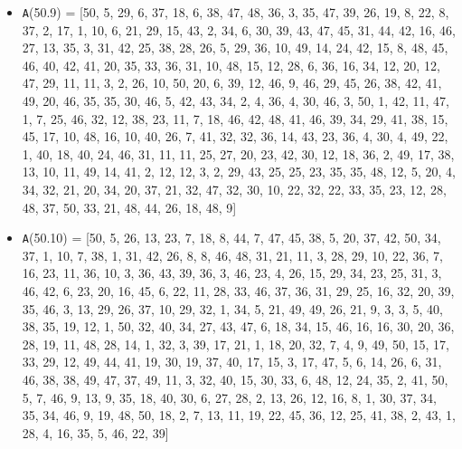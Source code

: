 \documentclass[runningheads, a4paper]{llncs}
\begin{document}
\begin{itemize}
	\item {\texttt A(50.9) = } [50, 5, 29, 6, 37, 18, 6, 38, 47, 48, 36, 3, 35, 47, 39, 26, 19, 8, 22, 8, 37, 2, 17, 1, 10, 6, 21, 29, 15, 43, 2, 34, 6, 30, 39, 43, 47, 45, 31, 44, 42, 16, 46, 27, 13, 35, 3, 31, 42, 25, 38, 28, 26, 5, 29, 36, 10, 49, 14, 24, 42, 15, 8, 48, 45, 46, 40, 42, 41, 20, 35, 33, 36, 31, 10, 48, 15, 12, 28, 6, 36, 16, 34, 12, 20, 12, 47, 29, 11, 11, 3, 2, 26, 10, 50, 20, 6, 39, 12, 46, 9, 46, 29, 45, 26, 38, 42, 41, 49, 20, 46, 35, 35, 30, 46, 5, 42, 43, 34, 2, 4, 36, 4, 30, 46, 3, 50, 1, 42, 11, 47, 1, 7, 25, 46, 32, 12, 38, 23, 11, 7, 18, 46, 42, 48, 41, 46, 39, 34, 29, 41, 38, 15, 45, 17, 10, 48, 16, 10, 40, 26, 7, 41, 32, 32, 36, 14, 43, 23, 36, 4, 30, 4, 49, 22, 1, 40, 18, 40, 24, 46, 31, 11, 11, 25, 27, 20, 23, 42, 30, 12, 18, 36, 2, 49, 17, 38, 13, 10, 11, 49, 14, 41, 2, 12, 12, 3, 2, 29, 43, 25, 25, 23, 35, 35, 48, 12, 5, 20, 4, 34, 32, 21, 20, 34, 20, 37, 21, 32, 47, 32, 30, 10, 22, 32, 22, 33, 35, 23, 12, 28, 48, 37, 50, 33, 21, 48, 44, 26, 18, 48, 9]
	\item {\texttt A(50.10) = } [50, 5, 26, 13, 23, 7, 18, 8, 44, 7, 47, 45, 38, 5, 20, 37, 42, 50, 34, 37, 1, 10, 7, 38, 1, 31, 42, 26, 8, 8, 46, 48, 31, 21, 11, 3, 28, 29, 10, 22, 36, 7, 16, 23, 11, 36, 10, 3, 36, 43, 39, 36, 3, 46, 23, 4, 26, 15, 29, 34, 23, 25, 31, 3, 46, 42, 6, 23, 20, 16, 45, 6, 22, 11, 28, 33, 46, 37, 36, 31, 29, 25, 16, 32, 20, 39, 35, 46, 3, 13, 29, 26, 37, 10, 29, 32, 1, 34, 5, 21, 49, 49, 26, 21, 9, 3, 3, 5, 40, 38, 35, 19, 12, 1, 50, 32, 40, 34, 27, 43, 47, 6, 18, 34, 15, 46, 16, 16, 30, 20, 36, 28, 19, 11, 48, 28, 14, 1, 32, 3, 39, 17, 21, 1, 18, 20, 32, 7, 4, 9, 49, 50, 15, 17, 33, 29, 12, 49, 44, 41, 19, 30, 19, 37, 40, 17, 15, 3, 17, 47, 5, 6, 14, 26, 6, 31, 46, 38, 38, 49, 47, 37, 49, 11, 3, 32, 40, 15, 30, 33, 6, 48, 12, 24, 35, 2, 41, 50, 5, 7, 46, 9, 13, 9, 35, 18, 40, 30, 6, 27, 28, 2, 13, 26, 12, 16, 8, 1, 30, 37, 34, 35, 34, 46, 9, 19, 48, 50, 18, 2, 7, 13, 11, 19, 22, 45, 36, 12, 25, 41, 38, 2, 43, 1, 28, 4, 16, 35, 5, 46, 22, 39]
\end{itemize}
\end{document}
